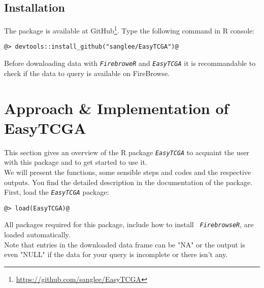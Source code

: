\documentclass{TechReport}
\begin{document}
\subsection{Installation}
The package is available at
GitHub\footnote{\url{https://github.com/sanglee/EasyTCGA}}. Type the following
command in R console:
\begin{lstlisting}[style=base]
@> devtools::install_github("sanglee/EasyTCGA")@
\end{lstlisting}
Before downloading data with \texttt{\em FirebroweR} and \texttt{\em EasyTCGA} it is
recommandable to check if the data to query is available 
on FireBrowse.\\

\section{Approach \& Implementation of EasyTCGA}
This section gives an overview of the R package \texttt{\em EasyTCGA} to acquaint
the user with this package and to get started to use it.\\
We will present the functions, some sensible steps and codes and the respective
outputs. You find the detailed description in the
documentation of the package.\\
First, load the \texttt{\em EasyTCGA} package:
\begin{lstlisting}[style=base]
@> load(EasyTCGA)@
\end{lstlisting}
All packages required for this package, include how to install \texttt{\em
FirebrowseR}, are loaded automatically.\\
Note that entries in the downloaded data frame can be "NA" or the output is even
"NULL" if the data for your query is incomplete or there isn't any.\\
\end{document}
